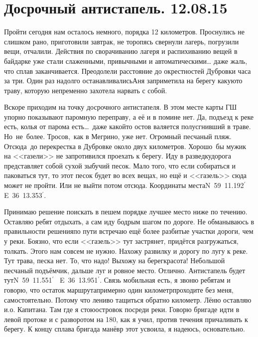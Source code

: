 \chapter{Досрочный антистапель. 12.08.15}

Пройти сегодня нам осталось немного, порядка 12 километров. Проснулись не слишком рано, приготовили завтрак, не торопясь свернули лагерь, погрузили вещи, отчалили. Действия по сворачиванию лагеря и распихиванию вещей в байдарке уже стали слаженными, привычными и автоматическими… даже жаль, что сплав заканчивается. Преодолели расстояние до окрестностей Дубровки часа за три. Один раз надолго останавливались\mdash Аня заприметила на берегу какую\sdash то траву, которую непременно захотела нарвать с собой. 

Вскоре приходим на точку досрочного антистапеля. В этом месте карты ГШ упорно показывают паромную переправу, а её и в помине нет. Да, подъезд к реке есть, колья от парома есть\ldots~даже какой\sdash то остов валяется полусгнивший в траве. Но~не~более. Тросов,~как в Мегрино, уже нет. Огромный песчаный пляж. Отсюда~до перекрестка в Дубровке около двух километров. Хорошо~бы мужик на <<газели>> не запротивился проехать к берегу. Иду в разведку\mdash дорога представляет собой сухой зыбучий песок. Мало того, что если собираться и паковаться тут, то этот песок будет во всех вещах, но ещё и <<газель>> сюда может не пройти. Или не выйти потом отсюда. Координаты места\mdash N~59\degree~11.192$^\prime$~ E~36\degree~13.353$^\prime$.

Принимаю решение поискать в пешем порядке лучшее место ниже по течению. Оставляю ребят отдыхать, а сам иду бодрым шагом по дороге. Не обманываюсь в правильности решения\mdash по пути встречаю ещё более разбитые участки дороги, чем у реки. Боязно, что если <<газель>> тут застрянет, придётся разгружаться, толкать. Этого нам совсем не нужно. Нахожу развилку и дорогу по лугу к реке. Тут трава, песка нет. То, что надо! Выхожу на берег\mdash красота! Небольшой песчаный подъёмчик, дальше луг и ровное место. Отлично. Антистапель будет тут\mdash N~59\degree~11.551$^\prime$~ E~36\degree~13.951$^\prime$. Связь мобильная есть, я звоню ребятам и говорю, что остаток маршрута\mdash примерно один километр\mdash проходите без меня, самостоятельно. Потому что лениво тащиться обратно километр. Лёню оставляю и.о. Капитана. Там где я стою\mdash островок посреди реки. Говорю бригаде идти в левой протоке и с разворотом на 180\degree, как я учил, против течения причаливать к берегу. К концу сплава бригада манёвр этот усвоила, я надеюсь, основательно. 

